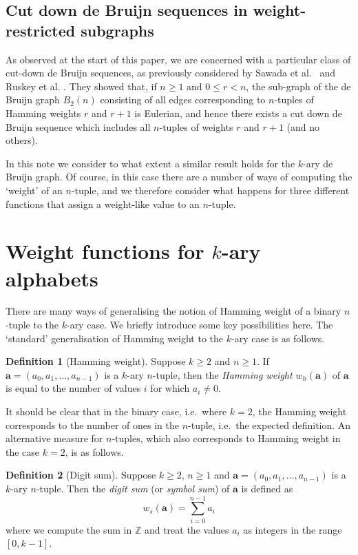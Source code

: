 \documentclass[a4paper,11pt]{article}
\theoremstyle{plain}
\theoremstyle{definition}
\newtheorem{definition}{Definition}[section]
\theoremstyle{remark}
\begin{document}
\subsection{Cut down de Bruijn sequences in weight-restricted subgraphs}

As observed at the start of this paper, we are concerned with a particular class of cut-down de
Bruijn sequences, as previously considered by Sawada et al.~\cite{Sawada11} and Ruskey et al.
\cite{Ruskey12}. They showed that, if $n\geq1$ and $0\leq r<n$, the sub-graph of the de Bruijn
graph $B_2(n)$ consisting of all edges corresponding to $n$-tuples of Hamming weights $r$ and
$r+1$ is Eulerian, and hence there exists a cut down de Bruijn sequence which includes all
$n$-tuples of weights $r$ and $r+1$ (and no others).

In this note we consider to what extent a similar result holds for the $k$-ary de Bruijn graph.  Of
course, in this case there are a number of ways of computing the `weight' of an $n$-tuple, and we
therefore consider what happens for three different functions that assign a weight-like value to an
$n$-tuple.

\section{Weight functions for $k$-ary alphabets}

There are many ways of generalising the notion of Hamming weight of a binary $n$-tuple to the
$k$-ary case.  We briefly introduce some key possibilities here. The `standard' generalisation of
Hamming weight to the $k$-ary case is as follows.

\begin{definition}[Hamming weight]  \label{definition:Hamming_weight}
Suppose $k\geq2$ and $n\geq1$.  If $\mathbf{a}=(a_0,a_1,\dots,a_{n-1})$ is a $k$-ary $n$-tuple,
then the \emph{Hamming weight} $w_h(\mathbf{a})$ of $\mathbf{a}$ is equal to the number of values
$i$ for which $a_i\neq0$.
\end{definition}

It should be clear that in the binary case, i.e.\ where $k=2$, the Hamming weight corresponds to
the number of ones in the $n$-tuple, i.e.\ the expected definition.  An alternative measure for
$n$-tuples, which also corresponds to Hamming weight in the case $k=2$, is as follows.

\begin{definition}[Digit sum]  \label{definition:digit_sum}
Suppose $k\geq2$, $n\geq1$ and $\mathbf{a}=(a_0,a_1,\dots,a_{n-1})$ is a $k$-ary $n$-tuple. Then
the \emph{digit sum} (or \emph{symbol sum}) of $\mathbf{a}$ is defined as
\[ w_s(\mathbf{a}) = \sum_{i=0}^{n-1}a_i \]
where we compute the sum in $\mathbb{Z}$ and treat the values $a_i$ as integers in the range
$[0,k-1]$.
\end{definition}
\end{document}
